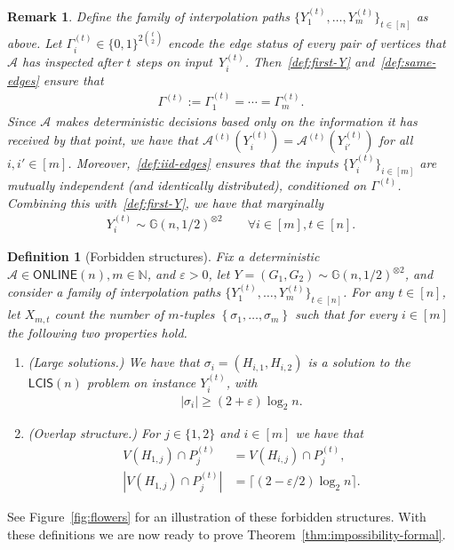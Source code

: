 \documentclass[11pt]{article}
\theoremstyle{plain}
\newtheorem{definition}{Definition}
\newtheorem{remark}{Remark}
\theoremstyle{definition}
\theoremstyle{remark}
\newcommand{\Gnhalf}{\mathbb{G}(n,1/2)}
\newcommand{\N}{\mathbb{N}}
\newcommand{\eps}{\varepsilon}
\newcommand{\MCS}{\mathsf{LCIS}}
\newcommand{\Alg}{\mathcal{A}}
\newcommand{\online}{\mathsf{ONLINE}}
\begin{document}
\begin{remark}\label{rem:interpret-interpolation}
    Define the family of interpolation paths $\{Y_1^{(t)}, \dots, Y_m^{(t)}\}_{t \in [n]}$ as above. Let $\Gamma_i^{(t)} \in \{0,1\}^{2 \binom{t}{2}}$ encode the edge status of every pair of vertices that $\Alg$ has inspected after $t$ steps on input~$Y_i^{(t)}$. Then~\eqref{def:first-Y} and~\eqref{def:same-edges} ensure that
    \begin{align*}
        \Gamma^{(t)} := \Gamma_1^{(t)} = \cdots = \Gamma_m^{(t)}.
    \end{align*}
    Since $\Alg$ makes deterministic decisions based only on the information it has received by that point, we have that $\Alg^{(t)}(Y_i^{(t)}) = \Alg^{(t)}(Y_{i'}^{(t)})$ for all $i, i' \in [m]$. Moreover,~\eqref{def:iid-edges} ensures that the inputs $\{Y_i^{(t)}\}_{i \in [m]}$ are mutually independent (and identically distributed), conditioned on $\Gamma^{(t)}$.  Combining this with~\eqref{def:first-Y}, we have that marginally
    \begin{align*}
        Y_i^{(t)} \sim \Gnhalf^{\otimes 2} \qquad \forall i \in [m], t \in [n].
    \end{align*}
\end{remark}

\begin{definition}[Forbidden structures]\label{def:forbidden-structures}
    Fix a deterministic $\Alg \in \online(n), m \in \N$, and $\eps > 0$, 
    let $Y = (G_1, G_2) \sim \Gnhalf^{\otimes 2}$, 
    and consider a family of interpolation paths $\{Y_1^{(t)}, \dots, Y_m^{(t)}\}_{t \in [n]}$. 
    For any $t \in [n]$, let $X_{m,t}$ count the number of $m$-tuples $\left\{\sigma_1, \dots, \sigma_m\right\}$ such that for every $i \in [m]$ the following two properties hold.
    \begin{enumerate}
        \item \emph{(Large solutions.)} We have that $\sigma_i = \left(H_{i,1}, H_{i,2}\right)$ is a solution to the $\MCS(n)$ problem on instance $Y_i^{(t)}$, with \label{prop:large-sol}
        \begin{align*}
            |\sigma_i| \geq (2 + \eps) \log_2 n.
        \end{align*} 
        \item \emph{(Overlap structure.)} For $j \in \{1, 2\}$ and $i \in [m]$ we have that \label{prop:two}
        \begin{align*}
            V(H_{1,j}) \cap P_j^{(t)} &= V(H_{i,j}) \cap P_j^{(t)}, \\
            \left| V(H_{1,j}) \cap P_j^{(t)} \right| &= \lceil (2 - \eps/2) \log_2 n\rceil. %
        \end{align*}
    \end{enumerate}
\end{definition}
See Figure~\ref{fig:flowers} for an illustration of these forbidden structures. 
With these definitions we are now ready to prove Theorem~\ref{thm:impossibility-formal}. 
\end{document}
